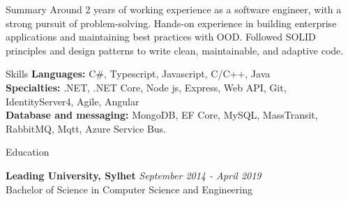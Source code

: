\documentclass{resume}
\begin{document}

\begin{rSection}{Summary}
Around 2 years of working experience as a software engineer, with a strong pursuit of problem-solving.
Hands-on experience in building enterprise applications and maintaining best practices with OOD.
Followed SOLID principles and design patterns to write clean, maintainable, and adaptive code.
\end{rSection}


\begin{rSection}{Skills}
{\bf Languages:} C\#, Typescript, Javascript, C/C++, Java\\
{\bf Specialties:} .NET, .NET Core, Node js, Express, Web API, Git, IdentityServer4, Agile, Angular\\
{\bf Database and messaging:} MongoDB, EF Core, MySQL, MassTransit, RabbitMQ, Mqtt, Azure Service Bus.
\end{rSection}


\begin{rSection}{Education}

{\bf Leading University, Sylhet} \hfill {\em September 2014 - April 2019}
\\ Bachelor of Science in Computer Science and Engineering
\end{rSection}

\end{document}
